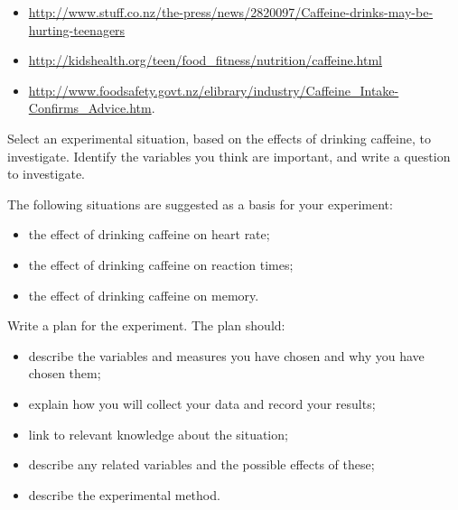 \begin{itemize}
  \item \url{http://www.stuff.co.nz/the-press/news/2820097/Caffeine-drinks-may-be-hurting-teenagers}
  \item \url{http://kidshealth.org/teen/food_fitness/nutrition/caffeine.html}
  \item \url{http://www.foodsafety.govt.nz/elibrary/industry/Caffeine_Intake-Confirms_Advice.htm}.
\end{itemize}
Select an experimental situation, based on the effects of drinking caffeine, to investigate. Identify
the variables you think are important, and write a question to investigate.

The following situations are suggested as a basis for your experiment:
\begin{itemize}
  \item the effect of drinking caffeine on heart rate;
  \item the effect of drinking caffeine on reaction times;
  \item the effect of drinking caffeine on memory.
\end{itemize}

Write a plan for the experiment. The plan should:
\begin{itemize}
  \item describe the variables and measures you have chosen and why you have chosen them;
  \item explain how you will collect your data and record your results;
  \item link to relevant knowledge about the situation;
  \item describe any related variables and the possible effects of these;
  \item describe the experimental method.
\end{itemize}



